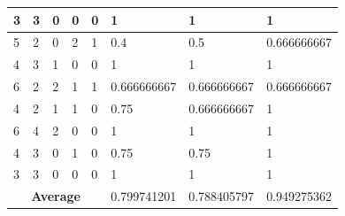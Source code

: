 \begin{small}
\begin{longtable}{|l|l|l|l|l|l|l|l|}
3  & 3           & 0           & 0           & 0           & 1                 & 1                  & 1               \\ \hline
5  & 2           & 0           & 2           & 1           & 0.4               & 0.5                & 0.666666667     \\ \hline
4  & 3           & 1           & 0           & 0           & 1                 & 1                  & 1               \\ \hline
6  & 2           & 2           & 1           & 1           & 0.666666667       & 0.666666667        & 0.666666667     \\ \hline
4  & 2           & 1           & 1           & 0           & 0.75              & 0.666666667        & 1               \\ \hline
6  & 4           & 2           & 0           & 0           & 1                 & 1                  & 1               \\ \hline
4  & 3           & 0           & 1           & 0           & 0.75              & 0.75               & 1               \\ \hline
3  & 3           & 0           & 0           & 0           & 1                 & 1                  & 1               \\ \hline
\multicolumn{5}{|c|}{\textbf{Average}}                                   & 0.799741201       & 0.788405797        & 0.949275362     \\ \hline
\end{longtable}
\end{small}
\endgroup


